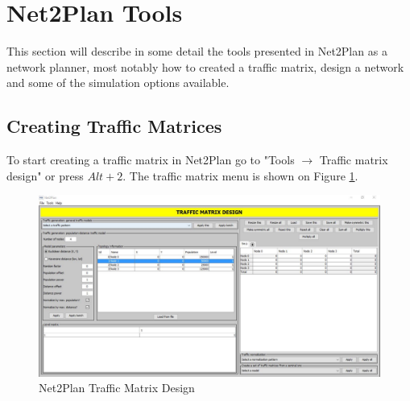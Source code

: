 %		
%	
%		
%		
%
%		   	

\section*{Net2Plan Tools}
This section will describe in some detail the tools presented in Net2Plan as a network planner, most notably how to created a traffic matrix, design a network and some of the simulation options available.

	\subsection*{Creating Traffic Matrices}
    To start creating a traffic matrix in Net2Plan go to "Tools $\rightarrow$ Traffic matrix design" or press $Alt+2$. The traffic matrix menu is shown on Figure \ref{Net2Plan_traffic}.
	
	\begin{figure}[h!]
		\vspace{-0.3cm}
		\centering	
		\includegraphics[width = 16cm]{Net2Plan_traffic.pdf}
		\caption{Net2Plan Traffic Matrix Design}
		\label{Net2Plan_traffic}
	\end{figure}
		
